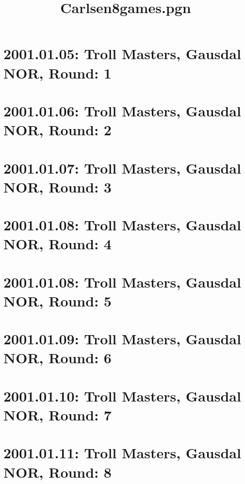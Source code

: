 \documentclass[11pt, twoside]{article}
\title{Carlsen8games.pgn}
\newcommand*\cleartoleftpage{%
  \clearpage
  \ifodd\value{page}\hbox{}\newpage\fi
}
\begin{document}
\maketitle

\newpage

\tableofcontents
\newpage

\printindex
\cleartoleftpage

\section{2001.01.05: Troll Masters, Gausdal NOR, Round: 1}

\cleartoleftpage

\section{2001.01.06: Troll Masters, Gausdal NOR, Round: 2}

\cleartoleftpage

\section{2001.01.07: Troll Masters, Gausdal NOR, Round: 3}

\cleartoleftpage

\section{2001.01.08: Troll Masters, Gausdal NOR, Round: 4}

\cleartoleftpage

\section{2001.01.08: Troll Masters, Gausdal NOR, Round: 5}

\cleartoleftpage

\section{2001.01.09: Troll Masters, Gausdal NOR, Round: 6}

\cleartoleftpage

\section{2001.01.10: Troll Masters, Gausdal NOR, Round: 7}

\cleartoleftpage

\section{2001.01.11: Troll Masters, Gausdal NOR, Round: 8}

\end{document}
